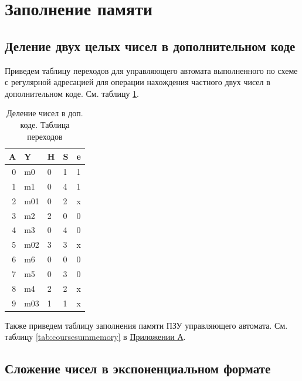 \documentclass[a4paper,14pt]{extarticle}
\begin{document}
\fi







\section{Заполнение памяти}

\subsection{Деление двух целых чисел в дополнительном коде}

Приведем таблицу переходов для управляющего автомата выполненного по схеме с регулярной адресацией для операции нахождения частного двух чисел в дополнительном коде. См. таблицу \ref{tab:coursedivsteps}.

\begin{table}[h!]
	\centering
	\begin{tabular}{|r||l|l|l|l|}
		\hline
		\multicolumn{1}{|l||}{\textbf{A}} & \textbf{Y} & \textbf{H} & \textbf{S} & \textbf{e} \\ \hline
		0 & m0 & 0 & 1 & 1 \\ \hline
		1 & m1 & 0 & 4 & 1 \\ \hline
		2 & m01 & 0 & 2 & x \\ \hline
		3 & m2 & 2 & 0 & 0 \\ \hline
		4 & m3 & 0 & 4 & 0 \\ \hline
		5 & m02 & 3 & 3 & x \\ \hline
		6 & m6 & 0 & 0 & 0 \\ \hline
		7 & m5 & 0 & 3 & 0 \\ \hline
		8 & m4 & 2 & 2 & x \\ \hline
		9 & m03 & 1 & 1 & x \\ \hline
	\end{tabular}
	\caption{Деление чисел в доп. коде. Таблица переходов}
	\label{tab:coursedivsteps}

\end{table}

Также приведем таблицу заполнения памяти ПЗУ управляющего автомата. См. таблицу \ref{tab:coursesummemory} в \hyperref[tam]{Приложении А}.

\subsection{Сложение чисел в экспоненциальном формате}
\end{document}
